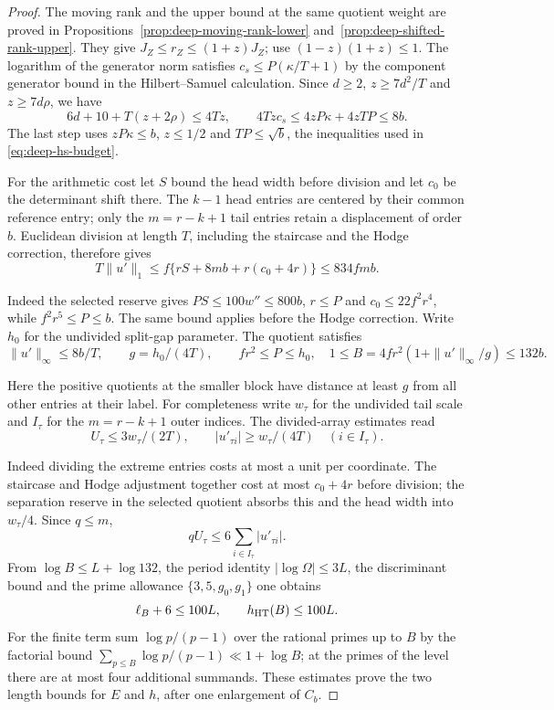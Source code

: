 \begin{proof}
The moving rank and the upper bound at the same quotient weight are proved in Propositions~\ref{prop:deep-moving-rank-lower} and~\ref{prop:deep-shifted-rank-upper}. They give \(J_Z\le r_Z\le(1+z)J_Z\); use \((1-z)(1+z)\le1\). The logarithm of the generator norm satisfies \(c_s\le P(\kappa/T+1)\) by the component generator bound in the Hilbert--Samuel calculation. Since \(d\ge2\), \(z\ge7d^2/T\) and \(z\ge7d\rho\), we have
\[
 6d+10+T(z+2\rho)\le4Tz,
 \qquad 4Tz c_s\le4zP\kappa+4zTP\le8b .
\]
The last step uses \(zP\kappa\le b\), \(z\le1/2\) and \(TP\le\sqrt b\), the inequalities used in \eqref{eq:deep-hs-budget}.

For the arithmetic cost let \(S\) bound the head width before division and let \(c_0\) be the determinant shift there. The \(k-1\) head entries are centered by their common reference entry; only the \(m=r-k+1\) tail entries retain a displacement of order \(b\). Euclidean division at length \(T\), including the staircase and the Hodge correction, therefore gives
\[
 T\|u'\|_1\le f\{rS+8mb+r(c_0+4r)\}\le834fmb .
\]

Indeed the selected reserve gives \(P S\le100w''\le800b\), \(r\le P\) and \(c_0\le22 f^2r^4\), while \(f^2r^5\le P\le b\). The same bound applies before the Hodge correction. Write \(h_0\) for the undivided split-gap parameter. The quotient satisfies
\[
   \|u'\|_\infty\le 8b/T,\qquad g=h_0/(4T),\qquad
   fr^2\le P\le h_0,\quad
   1\le B=4fr^2(1+\|u'\|_\infty/g)\le132b.
\]

Here the positive quotients at the smaller block have distance at least \(g\) from all other entries at their label. For completeness write \(w_\tau\) for the undivided tail scale and \(I_\tau\) for the \(m=r-k+1\) outer indices. The divided-array estimates read
\[
 U_\tau\le 3w_\tau/(2T),\qquad
       |u'_{\tau i}|\ge w_\tau/(4T)\quad(i\in I_\tau).
\]

Indeed dividing the extreme entries costs at most a unit per coordinate. The staircase and Hodge adjustment together cost at most \(c_0+4r\) before division; the separation reserve in the selected quotient absorbs this and the head width into \(w_\tau/4\). Since \(q\le m\),
\[
        q U_\tau\le 6\sum_{i\in I_\tau}|u'_{\tau i}|.
\]
 From \(\log B\le L+\log132\), the period identity \(|\log\Omega|\le3L\), the discriminant bound and the prime allowance \(\{3,5,g_0,g_1\}\) one obtains
\[
 \ell_B+6\le100L,\qquad h_{\rm HT}(B)\le100L.
\]
For the finite term sum \(\log p/(p-1)\) over the rational primes up to \(B\) by the factorial bound \(\sum_{p\le B}\log p/(p-1)\ll1+\log B\); at the primes of the level there are at most four additional summands. These estimates prove the two length bounds for \(E\) and \(h\), after one enlargement of \(C_b\).


\end{proof}
